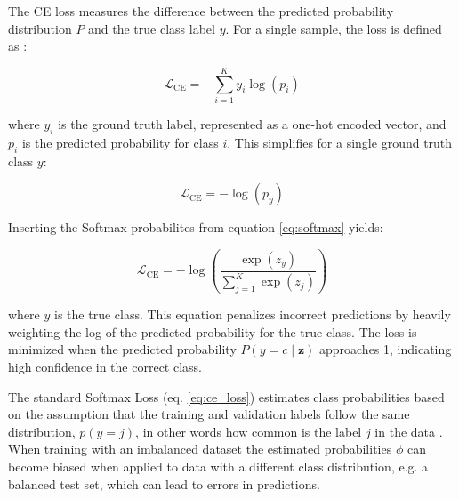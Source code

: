 The CE loss measures the difference between the predicted probability distribution $P$ and the true class label $y$. For a single sample, the loss is defined as \cite{zhang2023dive,cs231n}:

\begin{equation}
    \label{eq:ce_multi}
    \mathcal{L}_{\text{CE}} = -\sum_{i=1}^{K} y_i \log(p_i)
\end{equation}

where $y_i$ is the ground truth label, represented as a one-hot encoded vector, and $p_i$ is the predicted probability for class $i$. This simplifies for a single ground truth class $y$:

\begin{equation}
    \label{eq:ce_single}
    \mathcal{L}_{\text{CE}} = - \log(p_y)
\end{equation}

Inserting the Softmax probabilites from equation \eqref{eq:softmax} yields:

\begin{equation}
    \label{eq:ce_loss}
    \mathcal{L}_{\text{CE}} = - \log\left(\frac{\exp(z_y)}{\sum_{j=1}^{K} \exp(z_j)}\right)
\end{equation}

where $y$ is the true class. This equation penalizes incorrect predictions by heavily weighting the log of the predicted probability for the true class. The loss is minimized when the predicted probability \( P(y = c \mid \mathbf{z}) \) approaches 1, indicating high confidence in the correct class.

The standard Softmax Loss (eq. \eqref{eq:ce_loss}) estimates class probabilities based on the assumption that the training and validation labels follow the same distribution, $p(y=j)$, in other words how common is the label $j$ in the data \cite{ren2020balancedmetasoftmaxlongtailedvisual}. When training with an imbalanced dataset the estimated probabilities $\phi$ can become biased when applied to data with a different class distribution, e.g. a balanced test set, which can lead to errors in predictions.


